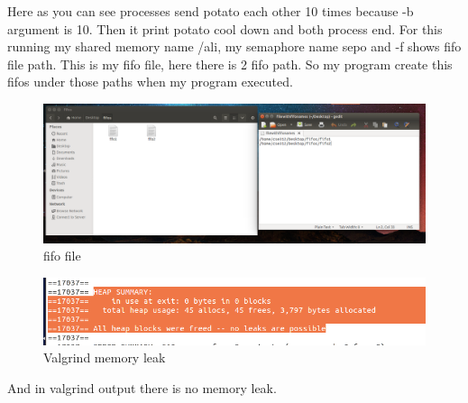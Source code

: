 \documentclass{article}
\begin{document}
Here as you can see processes send potato each other 10 times because -b argument is 10. Then it print potato cool down and both process end. For this running my shared memory name /ali, my semaphore name sepo and -f shows fifo file path.
This is my fifo file, here there is 2 fifo path. So my program create this fifos under those paths when my program executed.

\begin{figure}[h!]
\centering
\includegraphics[scale=0.3]{hw3_4.png}
\caption{fifo file}
\label{fig:running}
\end{figure}

\newpage

\begin{figure}[h!]
\centering
\includegraphics[scale=0.35]{hw3_2.png}
\caption{Valgrind memory leak}
\label{fig:running}
\end{figure}

And in valgrind output there is no memory leak.
\end{document}
